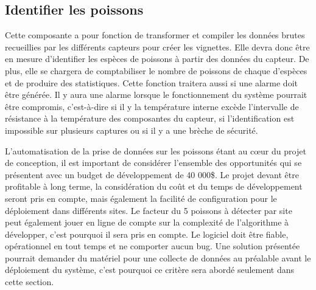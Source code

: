\begin{table}[!htb]
\footnotesize
\centering
{}
\caption{Faisabilité des concepts pour l'acheminer des données brutes}
\label{t:Decision_acheminer}
\end{table}
 

\subsection{Identifier les poissons}

Cette composante a pour fonction de transformer et compiler les données brutes recueillies par les différents capteurs pour créer les vignettes. Elle devra donc être en mesure d'identifier les espèces de poissons à partir des données du capteur. De plus, elle se chargera de comptabiliser le nombre de poissons de chaque d'espèces et de produire des statistiques. Cette fonction traitera aussi si une alarme doit être générée. Il y aura une alarme lorsque le fonctionnement du système pourrait être compromis, c'est-à-dire si il y la température interne excède l'intervalle de résistance à la température des composantes du capteur, si l'identification est impossible sur plusieurs captures ou si il y a une brèche de sécurité.

L’automatisation de la prise de données sur les poissons étant au cœur du projet de conception, il est important de considérer l’ensemble des opportunités qui se présentent avec un budget de développement de 40 000\$. Le projet devant être profitable à long terme, la considération du coût et du temps de développement seront pris en compte, mais également la facilité de configuration pour le déploiement dans différents sites. Le facteur du 5 poissons à détecter par site peut également jouer en ligne de compte sur la complexité de l’algorithme à développer, c’est pourquoi il sera pris en compte. Le logiciel doit être fiable, opérationnel en tout temps et ne comporter aucun bug. Une solution présentée pourrait demander du matériel pour une collecte de données au préalable avant le déploiement du système, c’est pourquoi ce critère sera abordé seulement dans cette section. 


